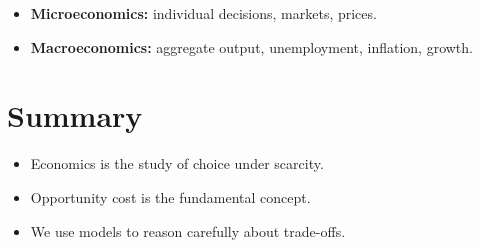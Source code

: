 \documentclass[11pt]{article}
\theoremstyle{definition}
\theoremstyle{remark}
\begin{document}
\begin{itemize}
  \item \textbf{Microeconomics:} individual decisions, markets, prices.
  \item \textbf{Macroeconomics:} aggregate output, unemployment, inflation, growth.
\end{itemize}

\section{Summary}

\begin{itemize}
  \item Economics is the study of choice under scarcity.
  \item Opportunity cost is the fundamental concept.
  \item We use models to reason carefully about trade-offs.
\end{itemize}
\end{document}

